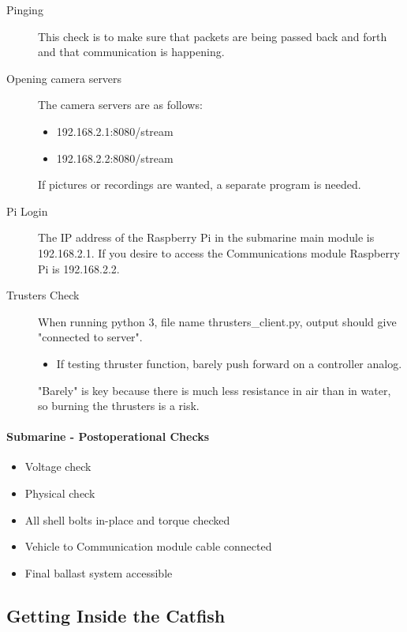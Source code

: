 \documentclass[
18pt, %
a4paper, %
oneside, %
headinclude,footinclude, %
]{scrartcl}
\begin{document}
\begin{description}
	\item[Pinging] 
	This check is to make sure that packets are being passed back and forth and that communication is happening.
	\item[Opening camera servers] 
	The camera servers are as follows:
	 
	\begin{itemize}[noitemsep]
		\item 192.168.2.1:8080/stream
		\item 192.168.2.2:8080/stream
	\end{itemize}

	If pictures or recordings are wanted, a separate program is needed.
	\item[Pi Login]
	The IP address of the Raspberry Pi in the submarine main module is 192.168.2.1. If you desire to access the Communications module Raspberry Pi is 192.168.2.2.
	\item[Trusters Check] When running python 3, file name thrusters\_client.py, output should give "connected to server". 
	\begin{itemize}
		\item If testing thruster function, barely push forward on a controller analog.
	\end{itemize} "Barely" is key because there is much less resistance in air than in water, so burning the thrusters is a risk.
\end{description}

\paragraph{Submarine - Postoperational Checks}

\begin{itemize}[noitemsep] %
	\item Voltage check
	\item Physical check
	\item All shell bolts in-place and torque checked
	\item Vehicle to Communication module cable connected
	\item Final ballast system accessible
\end{itemize}


\subsection{Getting Inside the Catfish}
\end{document}
